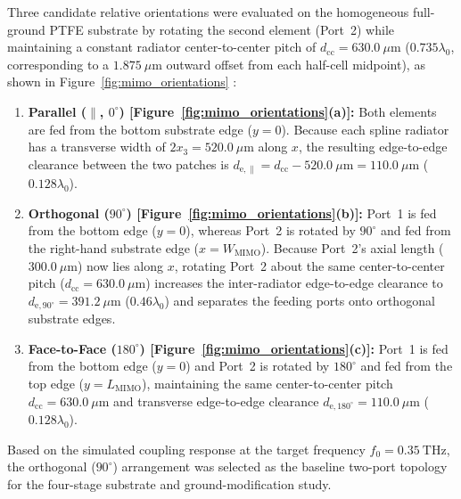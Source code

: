 \documentclass[referee,pdflatex,sn-mathphys-ay]{sn-jnl}
\begin{document}
Three candidate relative orientations were evaluated on the homogeneous full-ground PTFE substrate by rotating the second element (Port~2) while maintaining a constant radiator center-to-center pitch of $d_{\mathrm{cc}} = 630.0~\mu\mathrm{m}$ ($0.735\lambda_0$, corresponding to a $1.875~\mu\mathrm{m}$ outward offset from each half-cell midpoint), as shown in Figure~\ref{fig:mimo_orientations} \citep{OrientationStudy2023, taher2023, MIMOOrientationComparison2022}:
\begin{enumerate}
    \item \textbf{Parallel (\(\parallel\), \(0^{\circ}\)) [Figure~\ref{fig:mimo_orientations}(a)]:} Both elements are fed from the bottom substrate edge ($y=0$). Because each spline radiator has a transverse width of $2x_3 = 520.0~\mu\mathrm{m}$ along $x$, the resulting edge-to-edge clearance between the two patches is $d_{\mathrm{e,\parallel}} = d_{\mathrm{cc}} - 520.0~\mu\mathrm{m} = 110.0~\mu\mathrm{m}$ ($0.128\lambda_0$).
    \item \textbf{Orthogonal (\(90^{\circ}\)) [Figure~\ref{fig:mimo_orientations}(b)]:} Port~1 is fed from the bottom edge ($y=0$), whereas Port~2 is rotated by $90^{\circ}$ and fed from the right-hand substrate edge ($x = W_{\mathrm{MIMO}}$). Because Port~2's axial length ($300.0~\mu\mathrm{m}$) now lies along $x$, rotating Port~2 about the same center-to-center pitch ($d_{\mathrm{cc}} = 630.0~\mu\mathrm{m}$) increases the inter-radiator edge-to-edge clearance to $d_{\mathrm{e,90^{\circ}}} = 391.2~\mu\mathrm{m}$ ($0.46\lambda_0$) and separates the feeding ports onto orthogonal substrate edges.
    \item \textbf{Face-to-Face (\(180^{\circ}\)) [Figure~\ref{fig:mimo_orientations}(c)]:} Port~1 is fed from the bottom edge ($y=0$) and Port~2 is rotated by $180^{\circ}$ and fed from the top edge ($y = L_{\mathrm{MIMO}}$), maintaining the same center-to-center pitch $d_{\mathrm{cc}} = 630.0~\mu\mathrm{m}$ and transverse edge-to-edge clearance $d_{\mathrm{e,180^{\circ}}} = 110.0~\mu\mathrm{m}$ ($0.128\lambda_0$).
\end{enumerate}
Based on the simulated coupling response at the target frequency $f_0 = 0.35~\mathrm{THz}$, the orthogonal ($90^{\circ}$) arrangement was selected as the baseline two-port topology for the four-stage substrate and ground-modification study.
\end{document}
